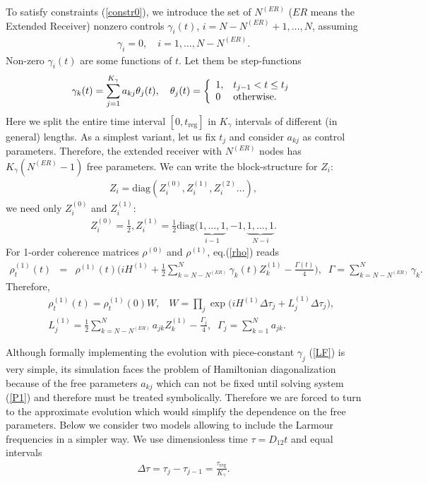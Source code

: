\documentclass[pra,preprint,showpacs]{revtex4-1}
\begin{document}
To satisfy constraints (\ref{constr0}), we introduce  the set of  $N^{(ER)}$ ($ER$ means the Extended Receiver) nonzero controls
$\gamma_i(t)$, $i=N-N^{(ER)}+1, \dots, N$,
assuming
\begin{eqnarray}
\gamma_i=0,\quad  i=1,\dots,N-N^{(ER)}.
\end{eqnarray}
Non-zero $\gamma_i(t)$ are some functions of $t$. Let them be step-functions~\cite{PP_2023}
\begin{eqnarray}\label{LF}
\gamma_k(t) = \sum_{j=1}^{K_\gamma} a_{kj} \theta_j(t),\quad  \theta_j(t) =\left\{\begin{array}{ll}
1, &t_{j-1} < t\le t_j\cr
0  & {\mbox{otherwise}}. \end{array}
\right.
\end{eqnarray}
Here we split the entire time interval
$[0,t_{\mathrm{reg}}]$
in $K_\gamma$ intervals of different (in general) lengths.
As a simplest variant, let us fix $t_j$ and consider  $a_{kj}$ as control parameters.
Therefore, the extended receiver with $N^{(ER)}$ nodes has $K_\gamma(N^{(ER)}-1)$ free parameters.
We can write the block-structure for $Z_i$:
\begin{eqnarray}
Z_i ={\mbox{diag}}(Z_i^{(0)}, Z_i^{(1)},Z_i^{(2)} \dots),
\end{eqnarray}
we need only $Z_i^{(0)}$ and $Z_i^{(1)}$:
\begin{eqnarray}
Z_i^{(0)} =\frac{1}{2}, Z_i^{(1)} = \frac{1}{2} {\mbox{diag}}( \underbrace{1,\dots,1}_{i-1}, -1, \underbrace{1,\dots,1}_{N-i}.
\end{eqnarray}
For 1-order coherence matrices $\rho^{(0)}$ and $\rho^{(1)}$, eq.(\ref{rho}) reads
\begin{eqnarray}\label{rho01coh}
 \rho^{(1)}_t(t)&=&\rho^{(1)}(t) \Big(i H^{(1)}+  \frac{1}{2}   \sum_{k=N-N^{(ER)}}^N\gamma_k (t)Z^{(1)}_{k}
-\frac{\Gamma(t)}{4}\Big) ,\;\;\Gamma=\sum_{k=N-N^{(ER)}}^N \gamma_k.
\end{eqnarray}
Therefore,
\begin{eqnarray}
&&\rho^{(1)}_t(t) =  \rho^{(1)}_t(0)  W,\;\;\; W=\prod_{j} \exp\Big( i H^{(1)}\Delta \tau_j + L^{(1)}_j \Delta \tau_j  \Big), \\\nonumber
&&L^{(1)}_j=  \frac{1}{2}   \sum_{k=N-N^{(ER)}}^Na_{jk}Z^{(1)}_{k}
-\frac{\Gamma_j}{4},\;\;\Gamma_j=\sum_{k=1}^N a_{jk}.
\end{eqnarray}

Although  formally  implementing  the evolution with  piece-constant $\gamma_j$  (\ref{LF}) is very simple,
its simulation faces the problem of  Hamiltonian diagonalization because of the free parameters $a_{kj}$ which can not be fixed until solving system (\ref{P1}) {and therefore must be treated symbolically}. Therefore we are forced to turn to the approximate evolution which would simplify the dependence on the free parameters.
Below we consider two models allowing to include the Larmour frequencies in a simpler way. We use dimensionless time $\tau = D_{12} t$ and equal intervals
\begin{eqnarray}\label{dtau}
\Delta\tau = \tau_j-\tau_{j-1} ={ \frac{\tau_{\mathrm{reg}}}{K_\gamma}.}
\end{eqnarray}
\end{document}
